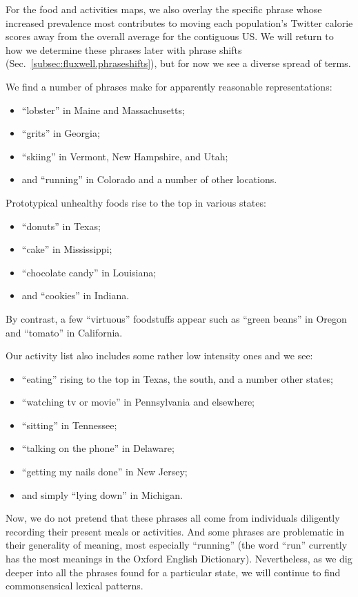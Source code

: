 \documentclass[10pt]{article}
\begin{document}
For the food and activities maps,
we also overlay the specific phrase whose increased prevalence
most contributes to moving each population's Twitter calorie scores away
from the overall average for the contiguous US.
We will return to how we determine these phrases
later with phrase shifts (Sec.~\ref{subsec:fluxwell.phraseshifts}),
but for now we see a diverse spread of terms.

We find a number of phrases make for 
apparently reasonable representations:
\begin{itemize}
\item 
``lobster'' in Maine and Massachusetts;
\item 
``grits'' in Georgia;
\item 
``skiing'' in Vermont, New Hampshire, and Utah;
\item 
and
``running'' in Colorado and a number of other locations.
\end{itemize}

Prototypical unhealthy foods rise to the top in various states:
\begin{itemize}
\item 
``donuts'' in Texas;
\item 
``cake'' in Mississippi;
\item 
``chocolate candy'' in Louisiana;
\item 
and ``cookies'' in Indiana.
\end{itemize}
By contrast, a few ``virtuous'' foodstuffs appear such as ``green beans''
in Oregon and ``tomato'' in California.

Our activity list also includes some rather low intensity
ones and we see:
\begin{itemize}
\item 
  ``eating'' rising to the top in Texas, the south, and a number other states;
\item 
  ``watching tv or movie'' in Pennsylvania and elsewhere;
\item 
  ``sitting'' in Tennessee;
\item 
  ``talking on the phone'' in Delaware;
\item 
  ``getting my nails done'' in New Jersey;
\item 
  and simply
  ``lying down'' in Michigan.
\end{itemize}

Now, we do not pretend that these phrases all
come from individuals diligently recording
their present meals or activities.
And some phrases are problematic in their 
generality of meaning, most especially ``running''
(the word ``run'' currently has the most meanings
in the Oxford English Dictionary).
Nevertheless, as we dig deeper into all the phrases
found for a particular state, 
we will continue to find commonsensical lexical patterns.
\end{document}
